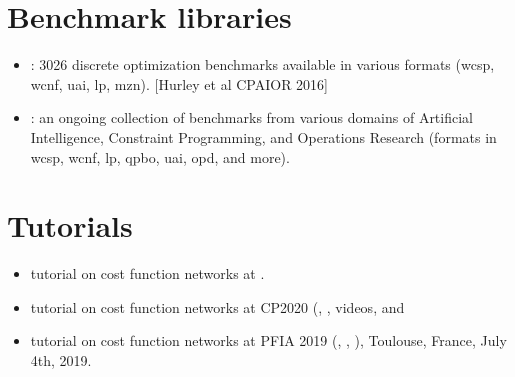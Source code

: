 \documentclass[letterpaper,10pt,openany,oneside,english]{sphinxmanual}
\begin{document}
\chapter{Benchmark libraries}
\label{\detokenize{benchmarks:benchmark-libraries}}\label{\detokenize{benchmarks:benchmarks}}\label{\detokenize{benchmarks::doc}}\begin{itemize}
\item {} 
\sphinxAtStartPar
{} : 3026 discrete optimization benchmarks available in various formats (wcsp, wcnf, uai, lp, mzn). {[}Hurley et al CPAIOR 2016{]}

\item {} 
\sphinxAtStartPar
{} : an on\sphinxhyphen{}going collection of benchmarks from various domains of Artificial Intelligence, Constraint Programming, and Operations Research (formats in wcsp, wcnf, lp, qpbo, uai, opd, and more).

\end{itemize}

\sphinxstepscope


\chapter{Tutorials}
\label{\detokenize{examples/tutorials:tutorials}}\label{\detokenize{examples/tutorials:id1}}\label{\detokenize{examples/tutorials::doc}}\begin{itemize}
\item {} 
\sphinxAtStartPar
tutorial  on
cost function networks at .

\item {} 
\sphinxAtStartPar
tutorial on cost function networks at CP2020 (, ,  videos, and 

\item {} 
\sphinxAtStartPar
tutorial on cost function networks at PFIA 2019 (, , ), Toulouse, France, July 4th, 2019.

\end{itemize}
\end{document}
